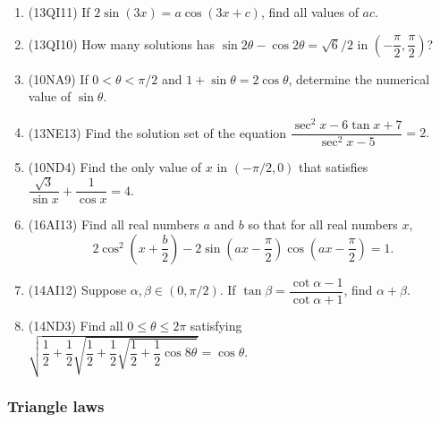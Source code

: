 \documentclass[10pt,paper=letter]{scrartcl}
\begin{document}
\begin{enumerate}

\item (13QI11) If $2\sin(3x) = a\cos(3x + c)$, find all values of $ac$.

\item (13QI10) How many solutions has $\sin 2\theta - \cos 2\theta = \sqrt{6}/2$ in $\left( -\dfrac{\pi}{2}, \dfrac{\pi}{2}\right)$?

\item (10NA9) If $0 < \theta < \pi/2$ and $1 + \sin \theta = 2\cos \theta$, determine the numerical value of $\sin \theta$.

\item (13NE13) Find the solution set of the equation $\dfrac{\sec^2 x - 6\tan x + 7}{\sec^2 x - 5} = 2.$

\item (10ND4) Find the only value of $x$ in $(-\pi/2, 0)$ that satisfies $\dfrac{\sqrt{3}}{\sin x} + \dfrac{1}{\cos x} = 4.$

\item (16AI13) Find all real numbers $a$ and $b$ so that for all real numbers $x,$ $$2\cos^2\left(x+\frac{b}{2}\right)-2\sin\left(ax-\frac{\pi}{2}\right)\cos\left(ax-\frac{\pi}{2}\right) = 1.$$

\item (14AI12) Suppose $\alpha, \beta \in (0, \pi/2)$. If $\tan \beta = \dfrac{\cot\alpha - 1}{\cot\alpha + 1}$, find $\alpha + \beta$.

\item (14ND3) Find all $0 \leq \theta \leq 2\pi$ satisfying $\sqrt{\dfrac{1}{2} + \dfrac{1}{2}\sqrt{\dfrac{1}{2} + \dfrac{1}{2}\sqrt{\dfrac{1}{2} + \dfrac{1}{2}\cos 8\theta}}} = \cos \theta.$

\end{enumerate}

\subsubsection*{Triangle laws}
\end{document}
